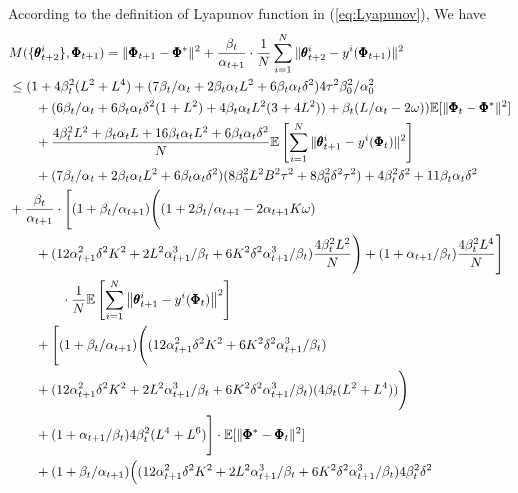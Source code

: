 \documentclass{article} %
\def\eqref#1{equation~\ref{#1}}
\theoremstyle{plain}
\theoremstyle{definition}
\theoremstyle{remark}
\renewcommand{\eqref}[1]{(\ref{#1})}
\begin{document}
{ According to the definition of Lyapunov function in \eqref{eq:Lyapunov},  We have
\begin{align}
   & M(\{\pmb{\theta}_{t+2}^i\}, \pmb{\Phi}_{t+1})= \|\pmb{\Phi}_{t+1}-\pmb{\Phi}^*\|^2+\frac{\beta_{t}}{\alpha_{t+1}}\cdot\frac{1}{N}\sum_{i=1}^N\|\pmb{\theta}_{t+2}^i-y^i(\pmb{\Phi}_{t+1})\|^2\nonumber\allowdisplaybreaks\\
    &\leq(1+4\beta_t^2(L^2+L^4)+(7\beta_t/\alpha_t+2\beta_t\alpha_tL^2+6\beta_t\alpha_t\delta^2)4\tau^2\beta_0^2/\alpha_0^2\nonumber\allowdisplaybreaks\\
    &\qquad+(6\beta_t/\alpha_t+6\beta_t\alpha_t\delta^2(1+L^2) +4\beta_t\alpha_tL^2(3+4L^2))+\beta_t(L/\alpha_t-2\omega))\mathbb{E}[\|\pmb{\Phi}_t-\pmb{\Phi}^*\|^2]\nonumber\allowdisplaybreaks\\
    &\qquad+\frac{4\beta_t^2L^2+\beta_t\alpha_tL+16\beta_t\alpha_t L^2+6\beta_t\alpha_t \delta^2}{N}\mathbb{E}\left[\sum_{i=1}^N\|\pmb{\theta}_{t+1}^i-y^i(\pmb{\Phi}_t)\|^2\right]\nonumber\allowdisplaybreaks\\
    &\qquad+(7\beta_t/\alpha_t+2\beta_t\alpha_t L^2+6\beta_t\alpha_t\delta^2)(8\beta_0^2L^2B^2\tau^2 +8\beta_0^2\delta^2\tau^2)+4\beta_t^2\delta^2+11\beta_t\alpha_t\delta^2\nonumber\allowdisplaybreaks\\
    &+\frac{\beta_t}{\alpha_{t+1}}\cdot\Bigg[(1+\beta_{t}/\alpha_{t+1})\Bigg((1+2\beta_{t}/\alpha_{t+1}-2\alpha_{t+1}K\omega)\nonumber\allowdisplaybreaks\\
    &\qquad+(12\alpha_{t+1}^2\delta^2K^2+2L^2\alpha_{t+1}^3/\beta_{t}+6K^2\delta^2\alpha_{t+1}^3/\beta_{t})\frac{4\beta_{t}^2L^2}{N}\Bigg)+(1+\alpha_{t+1}/\beta_{t})\frac{4\beta_{t}^2L^4}{N}\Bigg]\nonumber\allowdisplaybreaks\\
    &\qquad\qquad\cdot\frac{1}{N}\mathbb{E}\left[\sum_{i=1}^N\left\|\pmb{\theta}_{t+1}^i-y^i(\pmb{\Phi}_{t})\right\|^2 \right]\nonumber\allowdisplaybreaks\\
    &\qquad+\Bigg[(1+\beta_{t}/\alpha_{t+1})\Bigg((12\alpha_{t+1}^2\delta^2K^2+6K^2\delta^2\alpha_{t+1}^3/\beta_{t})\nonumber\allowdisplaybreaks\\
    &\qquad +(12\alpha_{t+1}^2\delta^2K^2+2L^2\alpha_{t+1}^3/\beta_{t}+6K^2\delta^2\alpha_{t+1}^3/\beta_{t})(4\beta_{t}(L^2+L^4))\Bigg)\nonumber\allowdisplaybreaks\\
   &\qquad+(1+\alpha_{t+1}/\beta_{t})4\beta_{t}^2(L^4+L^6)\Bigg]\cdot\mathbb{E}[\|\pmb{\Phi}^*-\pmb{\Phi}_{t}\|^2]\nonumber\allowdisplaybreaks\\
   &\qquad+(1+\beta_{t}/\alpha_{t+1})\Big((12\alpha_{t+1}^2\delta^2K^2+2L^2\alpha_{t+1}^3/\beta_{t}+6K^2\delta^2\alpha_{t+1}^3/\beta_{t})4\beta_{t}^2\delta^2\nonumber\allowdisplaybreaks\\

\end{align}}
\end{document}
